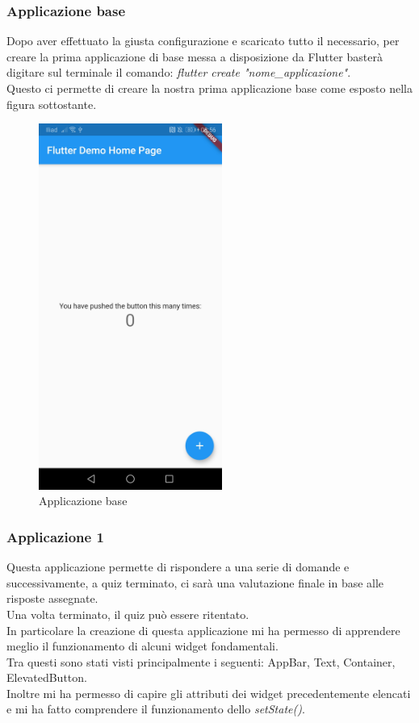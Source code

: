 \subsubsection{Applicazione base}
Dopo aver effettuato la giusta configurazione e scaricato tutto il necessario, per creare la prima applicazione di base messa a disposizione da Flutter basterà digitare sul terminale il comando: \textit{flutter create "nome\_applicazione"}.\\
Questo ci permette di creare la nostra prima applicazione base come esposto nella figura sottostante.\\

\begin{figure}[htbp]	
	\centering
	\includegraphics[width=6cm]{immagini/base.jpeg}
	\caption{Applicazione base}
	\label{fig:Applicazione base}
\end{figure}

\newpage

\subsubsection{Applicazione 1}
Questa applicazione permette di rispondere a una serie di domande e successivamente, a quiz terminato, ci sarà una valutazione finale in base alle risposte assegnate.\\
Una volta terminato, il quiz può essere ritentato.\\
In particolare la creazione di questa applicazione mi ha permesso di apprendere meglio il funzionamento di alcuni widget fondamentali.\\
Tra questi sono stati visti principalmente i seguenti: AppBar, Text, Container, ElevatedButton.\\
Inoltre mi ha permesso di capire gli attributi dei widget precedentemente elencati e mi ha fatto comprendere il funzionamento dello \textit{setState()}.\\

